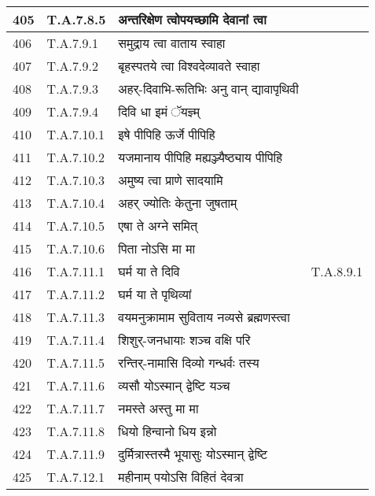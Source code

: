 \documentclass[17pt]{extarticle}
\begin{document}
\begin{longtable}{||p{0.4in}||p{0.9in}||p{4.0in}||p{0.9in}||}
        \hline
            405 & T.A.7.8.5 & अन्तरिक्षेण त्वोपयच्छामि देवानां त्वा &      \\
        \hline
            406 & T.A.7.9.1 & समुद्राय त्वा वाताय स्वाहा &      \\
        \hline
            407 & T.A.7.9.2 & बृहस्पतये त्वा विश्वदेव्यावते स्वाहा &      \\
        \hline
            408 & T.A.7.9.3 & अहर्{-}दिवाभि{-}रूतिभिः अनु वान् द्यावापृथिवी &      \\
        \hline
            409 & T.A.7.9.4 & दिवि धा इमं ॅयज्ञ्म् &      \\
        \hline
            410 & T.A.7.10.1 & इषे पीपिहि ऊर्जे पीपिहि &      \\
        \hline
            411 & T.A.7.10.2 & यजमानाय पीपिहि मह्यञ्ज्यैष्ठ्याय पीपिहि &      \\
        \hline
            412 & T.A.7.10.3 & अमुष्य त्वा प्राणे सादयामि &      \\
        \hline
            413 & T.A.7.10.4 & अहर् ज्योतिः केतुना जुषताम् &      \\
        \hline
            414 & T.A.7.10.5 & एषा ते अग्ने समित् &      \\
        \hline
            415 & T.A.7.10.6 & पिता नोऽसि मा मा &      \\
        \hline
            416 & T.A.7.11.1 & घर्म या ते दिवि &  T.A.8.9.1       \\
        \hline
            417 & T.A.7.11.2 & घर्म या ते पृथिव्यां &      \\
        \hline
            418 & T.A.7.11.3 & वयमनुक्रामाम सुविताय नव्यसे ब्रह्मणस्त्वा &      \\
        \hline
            419 & T.A.7.11.4 & शिशुर्{-}जनधायाः शञ्च वक्षि परि &      \\
        \hline
            420 & T.A.7.11.5 & रन्तिर्{-}नामासि दिव्यो गन्धर्वः तस्य &      \\
        \hline
            421 & T.A.7.11.6 & व्यसौ योऽस्मान् द्वेष्टि यञ्च &      \\
        \hline
            422 & T.A.7.11.7 & नमस्ते अस्तु मा मा &      \\
        \hline
            423 & T.A.7.11.8 & धियो हिन्वानो धिय इन्नो &      \\
        \hline
            424 & T.A.7.11.9 & दुर्मित्रास्तस्मै भूयासुः योऽस्मान् द्वेष्टि &      \\
        \hline
            425 & T.A.7.12.1 & महीनाम् पयोऽसि विहितं देवत्रा &      \\

\end{longtable}
\end{document}
